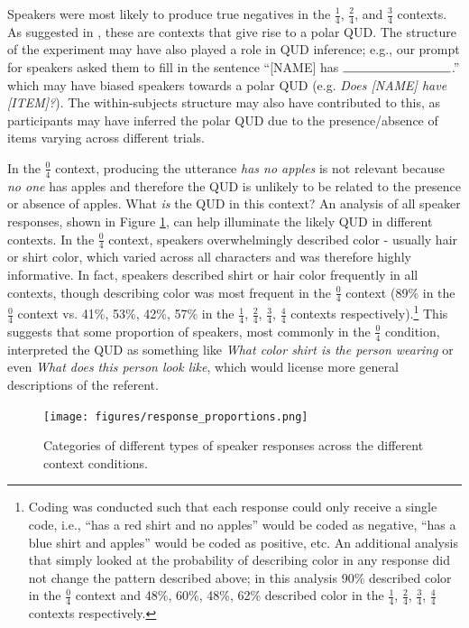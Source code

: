 \documentclass[man, floatsintext, noapacite]{apa6}
\begin{document}
Speakers were most likely to produce true negatives in the $\frac{1}{4}$, $\frac{2}{4}$, and $\frac{3}{4}$ contexts. As suggested in , these are contexts that give rise to a polar QUD. The structure of the experiment may have also played a role in QUD inference; e.g., our prompt for speakers asked them to fill in the sentence ``[NAME] has $\rule{3cm}{0.15mm}$.'' which may have biased speakers towards a polar QUD (e.g. \textit{Does [NAME] have [ITEM]?}). The within-subjects structure may also have contributed to this, as participants may have inferred the polar QUD due to the presence/absence of items varying across different trials.

In the $\frac{0}{4}$ context, producing the utterance \textit{has no apples} is not relevant because \textit{no one} has apples and therefore the QUD is unlikely to be related to the presence or absence of apples. What \textit{is} the QUD in this context? An analysis of all speaker responses, shown in Figure \ref{fig:props}, can help illuminate the likely QUD in different contexts. In the $\frac{0}{4}$ context, speakers overwhelmingly described color - usually hair or shirt color, which varied across all characters and was therefore highly informative. In fact, speakers described shirt or hair color frequently in all contexts, though describing color was most frequent in the $\frac{0}{4}$ context (89\% in the $\frac{0}{4}$ context vs. 41\%, 53\%, 42\%, 57\% in the $\frac{1}{4}$, $\frac{2}{4}$, $\frac{3}{4}$, $\frac{4}{4}$ contexts respectively).\footnote{Coding was conducted such that each response could only receive a single code, i.e., ``has a red shirt and no apples'' would be coded as negative, ``has a blue shirt and apples'' would be coded as positive, etc. An additional analysis that simply looked at the probability of describing color in any response did not change the pattern described above; in this analysis 90\% described color in the $\frac{0}{4}$ context and 48\%, 60\%, 48\%, 62\% described color in the $\frac{1}{4}$, $\frac{2}{4}$, $\frac{3}{4}$, $\frac{4}{4}$ contexts respectively.} This suggests that some proportion of speakers, most commonly in the $\frac{0}{4}$ condition, interpreted the QUD as something like \textit{What color shirt is the person wearing} or even \textit{What does this person look like}, which would license more general descriptions of the referent.

\begin{figure}[t]
\begin{center} 
\texttt{[image: figures/response\_proportions.png]}
\caption{\label{fig:props} Categories of different types of speaker responses across the different context conditions.}
\end{center} 
\end{figure}
\end{document}
